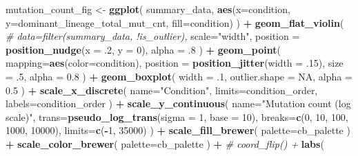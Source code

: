 \documentclass[]{book}
\newenvironment{Shaded}{\begin{snugshade}}{\end{snugshade}}
\newcommand{\CommentTok}[1]{\textcolor[rgb]{0.56,0.35,0.01}{\textit{#1}}}
\newcommand{\DataTypeTok}[1]{\textcolor[rgb]{0.13,0.29,0.53}{#1}}
\newcommand{\DecValTok}[1]{\textcolor[rgb]{0.00,0.00,0.81}{#1}}
\newcommand{\FloatTok}[1]{\textcolor[rgb]{0.00,0.00,0.81}{#1}}
\newcommand{\KeywordTok}[1]{\textcolor[rgb]{0.13,0.29,0.53}{\textbf{#1}}}
\newcommand{\NormalTok}[1]{#1}
\newcommand{\OperatorTok}[1]{\textcolor[rgb]{0.81,0.36,0.00}{\textbf{#1}}}
\newcommand{\OtherTok}[1]{\textcolor[rgb]{0.56,0.35,0.01}{#1}}
\newcommand{\StringTok}[1]{\textcolor[rgb]{0.31,0.60,0.02}{#1}}
\begin{document}
\begin{Shaded}
\begin{Highlighting}[]
{{{{\NormalTok{mutation_count_fig <-}\StringTok{ }\KeywordTok{ggplot}\NormalTok{(}
\NormalTok{    summary_data,}
    \KeywordTok{aes}\NormalTok{(}\DataTypeTok{x=}\NormalTok{condition, }\DataTypeTok{y=}\NormalTok{dominant_lineage_total_mut_cnt, }\DataTypeTok{fill=}\NormalTok{condition)}
\NormalTok{  ) }\OperatorTok{+}
\StringTok{  }\KeywordTok{geom_flat_violin}\NormalTok{(}
    \CommentTok{# data=filter(summary_data, !is_outlier),}
    \DataTypeTok{scale=}\StringTok{"width"}\NormalTok{,}
    \DataTypeTok{position =} \KeywordTok{position_nudge}\NormalTok{(}\DataTypeTok{x =} \FloatTok{.2}\NormalTok{, }\DataTypeTok{y =} \DecValTok{0}\NormalTok{),}
    \DataTypeTok{alpha =} \FloatTok{.8}
\NormalTok{  ) }\OperatorTok{+}
\StringTok{  }\KeywordTok{geom_point}\NormalTok{(}
    \DataTypeTok{mapping=}\KeywordTok{aes}\NormalTok{(}\DataTypeTok{color=}\NormalTok{condition),}
    \DataTypeTok{position =} \KeywordTok{position_jitter}\NormalTok{(}\DataTypeTok{width =} \FloatTok{.15}\NormalTok{),}
    \DataTypeTok{size =} \FloatTok{.5}\NormalTok{,}
    \DataTypeTok{alpha =} \FloatTok{0.8}
\NormalTok{  ) }\OperatorTok{+}
\StringTok{  }\KeywordTok{geom_boxplot}\NormalTok{(}
    \DataTypeTok{width =} \FloatTok{.1}\NormalTok{,}
    \DataTypeTok{outlier.shape =} \OtherTok{NA}\NormalTok{,}
    \DataTypeTok{alpha =} \FloatTok{0.5}
\NormalTok{  ) }\OperatorTok{+}
\StringTok{  }\KeywordTok{scale_x_discrete}\NormalTok{(}
    \DataTypeTok{name=}\StringTok{"Condition"}\NormalTok{,}
    \DataTypeTok{limits=}\NormalTok{condition_order,}
    \DataTypeTok{labels=}\NormalTok{condition_order}
\NormalTok{  ) }\OperatorTok{+}
\StringTok{  }\KeywordTok{scale_y_continuous}\NormalTok{(}
    \DataTypeTok{name=}\StringTok{"Mutation count (log scale)"}\NormalTok{,}
    \DataTypeTok{trans=}\KeywordTok{pseudo_log_trans}\NormalTok{(}\DataTypeTok{sigma =} \DecValTok{1}\NormalTok{, }\DataTypeTok{base =} \DecValTok{10}\NormalTok{),}
    \DataTypeTok{breaks=}\KeywordTok{c}\NormalTok{(}\DecValTok{0}\NormalTok{, }\DecValTok{10}\NormalTok{, }\DecValTok{100}\NormalTok{, }\DecValTok{1000}\NormalTok{, }\DecValTok{10000}\NormalTok{),}
    \DataTypeTok{limits=}\KeywordTok{c}\NormalTok{(}\OperatorTok{-}\DecValTok{1}\NormalTok{, }\DecValTok{35000}\NormalTok{)}
\NormalTok{  ) }\OperatorTok{+}
\StringTok{  }\KeywordTok{scale_fill_brewer}\NormalTok{(}
    \DataTypeTok{palette=}\NormalTok{cb_palette}
\NormalTok{  ) }\OperatorTok{+}
\StringTok{  }\KeywordTok{scale_color_brewer}\NormalTok{(}
    \DataTypeTok{palette=}\NormalTok{cb_palette}
\NormalTok{  ) }\OperatorTok{+}
\StringTok{  }\CommentTok{# coord_flip() +}
\StringTok{  }\KeywordTok{labs}\NormalTok{(}
}}}}
\end{Highlighting}
\end{Shaded}
\end{document}

